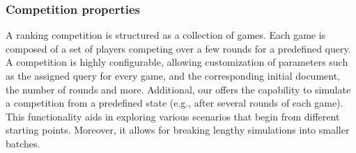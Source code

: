 
\subsubsection{Competition properties}\label{platform_game_properties}

A ranking competition is structured as a collection of games. Each game is composed of a set of players competing over a few rounds for a predefined query. A competition is highly configurable, allowing customization of parameters such as the assigned query for every game, and the corresponding initial document, the number of rounds and more.
Additional, our \platformName{} \platform{} offers the capability to simulate a competition from a predefined state (e.g., after several rounds of each game). This functionality aids in exploring various scenarios that begin from different starting points. Moreover, it allows for breaking lengthy simulations into smaller batches.


